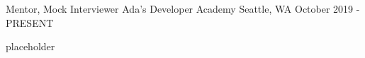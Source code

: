 

\begin{cventries}

  \cventry
    {Mentor, Mock Interviewer} %
    {Ada's Developer Academy} %
    {Seattle, WA} %
    {October 2019 - PRESENT} %
    {
      \begin{cvitems} %
        \item {placeholder}
      \end{cvitems}
    }

\end{cventries}
